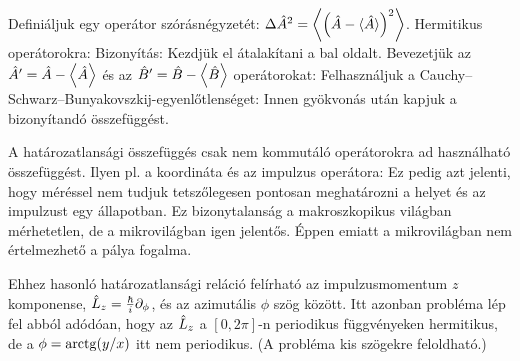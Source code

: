    Definiáljuk egy operátor szórásnégyzetét: $\Delta\hat{A}^2=\left\langle\Big(\hat{A}-\langle\hat{A}\rangle\Big)^2\right\rangle$. Hermitikus operátorokra:
   Bizonyítás: Kezdjük el átalakítani a bal oldalt. Bevezetjük az $\hat{A}'=\hat{A}-\left\langle\hat{A}\right\rangle$ és az $\hat{B}'=\hat{B}-\left\langle\hat{B}\right\rangle$ operátorokat:
   Felhasználjuk a Cauchy--Schwarz--Bunyakovszkij-egyenlőtlenséget:
   Innen gyökvonás után kapjuk a bizonyítandó összefüggést. 
   
   A határozatlansági összefüggés csak nem kommutáló operátorokra ad használható összefüggést. Ilyen pl. a koordináta és az impulzus operátora: 
   Ez pedig azt jelenti, hogy méréssel nem tudjuk tetszőlegesen pontosan meghatározni a helyet és az impulzust egy állapotban. Ez bizonytalanság a makroszkopikus világban mérhetetlen, de a mikrovilágban igen jelentős. Éppen emiatt a mikrovilágban nem értelmezhető a pálya fogalma.
   
   Ehhez hasonló határozatlansági reláció felírható az impulzusmomentum $z$ komponense, $\hat{L}_z=\frac\hbar i \partial_\phi$, és az azimutális $\phi$ szög között. Itt azonban probléma lép fel abból adódóan, hogy az $\hat{L}_z$ a $[0,2\pi]$-n periodikus függvényeken hermitikus, de a $\phi=\mathop{\mathrm{arctg}}\nolimits(y/x)$ itt nem periodikus. (A probléma kis szögekre feloldható.)
   
